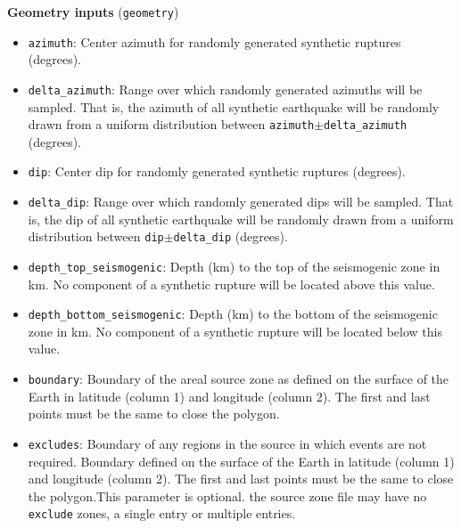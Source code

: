 \textbf{Geometry inputs} (\texttt{geometry})
\begin{itemize}

\item \texttt{azimuth}: Center azimuth for randomly generated
  synthetic ruptures (degrees).

\item \texttt{delta\_azimuth}: Range over which randomly generated
  azimuths will be sampled. That is, the azimuth of all synthetic
  earthquake will be randomly drawn from a uniform distribution
  between \texttt{azimuth}$\pm$\texttt{delta\_azimuth} (degrees).

\item \texttt{dip}: Center dip for randomly generated synthetic
  ruptures (degrees).

\item \texttt{delta\_dip}: Range over which randomly generated dips will
be sampled. That is, the dip of all synthetic earthquake will be
randomly drawn from a uniform distribution between
\texttt{dip}$\pm$\texttt{delta\_dip} (degrees).

\item \texttt{depth\_top\_seismogenic}: Depth (km) to the top of the
  seismogenic zone in km.  No component of a synthetic rupture will be
  located above this value.

\item \texttt{depth\_bottom\_seismogenic}: Depth (km) to the bottom of
  the seismogenic zone in km.  No component of a synthetic rupture
  will be located below this value.

\item \texttt{boundary}: Boundary of the areal source zone as
defined on the surface of the Earth in latitude (column 1) and
longitude (column 2). The first and last points must be the same to
close the polygon.

\item \texttt{excludes}: Boundary of any regions in the source in
  which events are not required. Boundary defined on the surface of
  the Earth in latitude (column 1) and longitude (column 2). The first
  and last points must be the same to close the polygon.This parameter
  is optional. the source zone file may have no \texttt{exclude}
  zones, a single entry or multiple entries.

\end{itemize}


